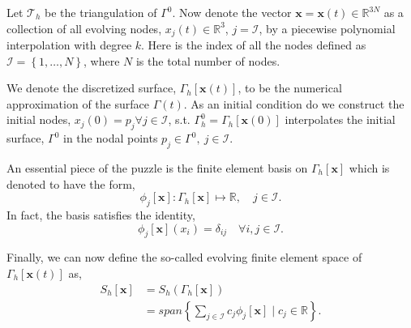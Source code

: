 Let $\mathcal{T}_{h}  $ be the triangulation of $\Gamma ^{0}$. Now denote the vector $ \mathbf{x} = \mathbf{x} \left( t \right)  \in \mathbb{R} ^{3N}$ as a collection of all evolving nodes, $x_{j}\left( t \right)  \in  \mathbb{R} ^3$, $j = \mathcal{I} $, by a piecewise polynomial interpolation
with degree $k$. Here is the index of all the nodes defined as $\mathcal{I} =\left\{ 1, \ldots, N \right\}  $, where $N$ is the total number of nodes.

We denote the discretized surface, $\Gamma _{h} \left[ \mathbf{x}\left( t \right)  \right] $, to be the numerical approximation of the surface $\Gamma \left( t \right) $. As an initial condition do we construct the initial nodes, $
 x_{j}( 0 )  = p_{j} \forall j \in  \mathcal{I}  $, s.t.
 $\Gamma _{h}^{0  } = \Gamma _{h} \left[ \mathbf{x}\left( 0 \right)   \right] $ interpolates the initial surface, $\Gamma ^{0}$ in the nodal points $p_{j} \in \Gamma ^{0}, \  j \in  \mathcal{I} $.

An essential piece of the puzzle is the finite element basis on $\Gamma _{h}\left[ \mathbf{x} \right] $ which is denoted to have the form,
\[
 \phi_{j} \left[ \mathbf{x} \right]: \Gamma_{h}\left[ \mathbf{x} \right] \mapsto \mathbb{R} , \quad   j \in  \mathcal{I} .
\]
In fact, the basis satisfies the identity, \[
\phi _{j} \left[ \mathbf{x} \right] \left( x_{i} \right)  = \delta _{ij} \quad \forall i,j \in  \mathcal{I} .
\]

Finally, we can now define the so-called evolving finite element space of $\Gamma _{h}\left[ \mathbf{x}\left( t \right)  \right] $ as, \[
    \begin{split}
S_{h}\left[ \mathbf{x} \right]   & = S_{h}\left( \Gamma _{h}\left[ \mathbf{x} \right]  \right) \\
 & = span\left\{ \sum_{j \in  \mathcal{I}  }^{}  c_{j} \phi _{j}\left[ \mathbf{x} \right]  \mid  c_{j} \in \mathbb{R}   \right\}.
    \end{split}
\]

